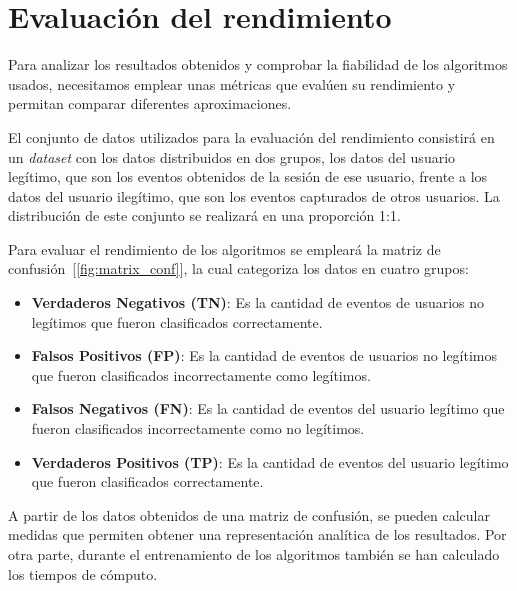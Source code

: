 \section{Evaluación del rendimiento}
\label{sec:metrics}

Para analizar los resultados obtenidos y comprobar la fiabilidad de los algoritmos usados, necesitamos emplear unas métricas que evalúen su rendimiento y permitan comparar diferentes aproximaciones.


El conjunto de datos utilizados para la evaluación del rendimiento consistirá en un \textit{dataset} con los datos distribuidos en dos grupos, los datos del usuario legítimo, que son los eventos obtenidos de la sesión de ese usuario, frente a los datos del usuario ilegítimo, que son los eventos capturados de otros usuarios. La distribución de este conjunto se realizará en una proporción 1:1.

Para evaluar el rendimiento de los algoritmos se empleará la matriz de confusión~[\cref{fig:matrix_conf}], la cual categoriza los datos en cuatro grupos:    


\begin{itemize}
    \item \textbf{Verdaderos Negativos (TN)}: Es la cantidad de eventos de usuarios no legítimos que fueron clasificados correctamente.

    \item \textbf{Falsos Positivos (FP)}: Es la cantidad de eventos de usuarios no legítimos que fueron clasificados incorrectamente como legítimos.

    \item \textbf{Falsos Negativos (FN)}: Es la cantidad de eventos del usuario legítimo que fueron clasificados incorrectamente como no legítimos.

    \item \textbf{Verdaderos Positivos (TP)}: Es la cantidad de eventos del usuario legítimo que fueron clasificados correctamente.
\end{itemize}



A partir de los datos obtenidos de una matriz de confusión, se pueden calcular medidas que permiten obtener una representación analítica de los resultados. Por otra parte, durante el entrenamiento de los algoritmos también se han calculado los tiempos de cómputo.

